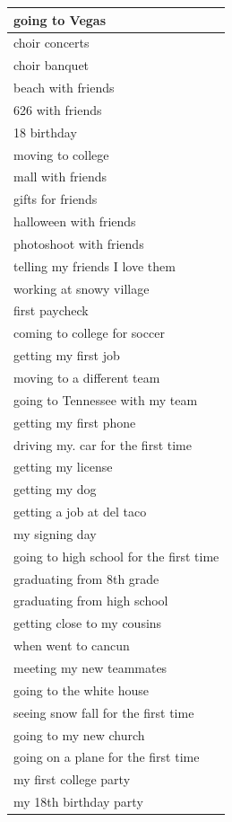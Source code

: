 \documentclass[
  .7em,
  letterpaper,
  DIV=11,
  numbers=noendperiod]{scrartcl}
\begin{document}
\begin{table}
\begin{tabular}{l}
\hline
going to Vegas\\
\hline
choir concerts\\
\hline
choir banquet\\
\hline
beach with friends\\
\hline
626 with friends\\
\hline
18 birthday\\
\hline
moving to college\\
\hline
mall with friends\\
\hline
gifts for friends\\
\hline
halloween with friends\\
\hline
photoshoot with friends\\
\hline
telling my friends I love them\\
\hline
working at snowy village\\
\hline
first paycheck\\
\hline
coming to college for soccer\\
\hline
getting my first job\\
\hline
moving to a different team\\
\hline
going to Tennessee with my team\\
\hline
getting my first phone\\
\hline
driving my. car for the first time\\
\hline
getting my license\\
\hline
getting my dog\\
\hline
getting a job at del taco\\
\hline
my signing day\\
\hline
going to high school for the first time\\
\hline
graduating from 8th grade\\
\hline
graduating from high school\\
\hline
getting close to my cousins\\
\hline
when went to cancun\\
\hline
meeting my new teammates\\
\hline
going to the white house\\
\hline
seeing snow fall for the first time\\
\hline
going to my new church\\
\hline
going on a plane for the first time\\
\hline
my first college party\\
\hline
my 18th birthday party\\

\end{tabular}
\end{table}
\end{document}
